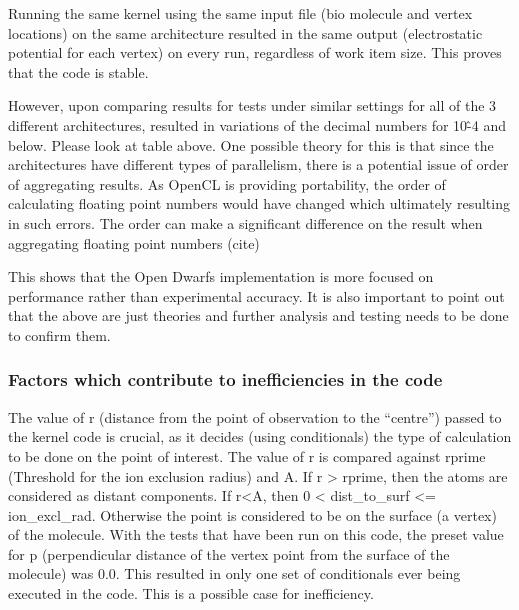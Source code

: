\par{Running the same kernel using the same input file 
    (bio molecule and vertex locations) on the same architecture resulted 
    in the same output (electrostatic potential for each vertex) on every run, 
    regardless of work item size. This proves that the code is stable.}

\par{However, upon comparing results for tests under similar settings for 
    all of the 3 different architectures, resulted in variations of the 
    decimal numbers for 10\^-4 and below. Please look at table above.
    One possible theory for this is that since the architectures have different 
    types of parallelism, there is a potential issue of order of aggregating 
    results. As OpenCL is providing portability, the order of calculating 
    floating point numbers would have changed which ultimately resulting in 
    such errors. The order can make a significant difference on the result 
    when aggregating floating point numbers ({\color{red}cite})}

\par{This shows that the Open Dwarfs implementation is 
    more focused on performance rather than experimental accuracy. 
    It is also important to point out that the above are just theories 
    and further analysis and testing needs to be done to confirm them.}

\subsubsection{Factors which contribute to inefficiencies in the code}
\par{The value of r (distance from the point of observation to the ``centre'') 
    passed to the kernel code is crucial, as it decides (using conditionals) 
    the type of calculation to be done on the point of interest. 
    The value of r is compared against rprime (Threshold for the 
    ion exclusion radius) and A. If r > rprime, then the atoms are 
    considered as distant components. If r<A, then 0 < dist\_to\_surf <= ion\_excl\_rad. 
    Otherwise the point is considered to be on the surface (a vertex) of the 
    molecule. With the tests that have been run on this code, the preset value 
    for p (perpendicular distance of the vertex point from the surface of 
    the molecule) was 0.0. This resulted in only one set of conditionals 
    ever being executed in the code. This is a possible case for 
    inefficiency.}

